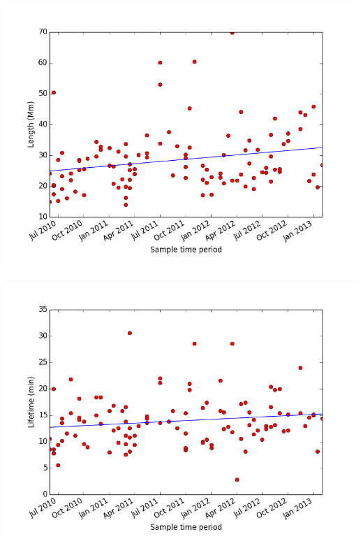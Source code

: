 \documentclass{beamer}
\begin{document}
	
	\begin{frame}
		\begin{minipage}{0.49\textwidth}
			\begin{flushleft}
				\includegraphics[width=1\textwidth]{Figs/length_vs_solarcycle.png}
			\end{flushleft}
		\end{minipage}
		\begin{minipage}{0.49\textwidth}
			\begin{center}
				\includegraphics[width=1\textwidth]{Figs/life_vs_solarcycle.png}
			\end{center}
		\end{minipage}\\

\end{frame}
\end{document}
